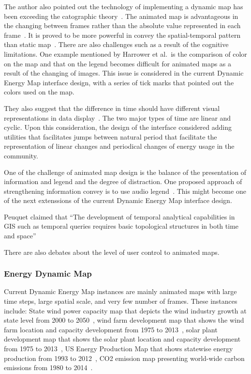 \documentclass[hidelinks,12pt]{article}
\begin{document}
The author also pointed out the technology of implementing a dynamic
map has been exceeding the catographic theory~\cite{Harrower2008}. The
animated map is advantageous in the changing between frames rather
than the absolute value represented in each
frame~\cite{Dorling1992}. It is proved to be more powerful in convey
the spatial-temporal pattern than static
map~\cite{McEachern1998}. There are also challenges such as a result
of the cognitive limitations. One example mentioned by Harrower et
al.\ is the comparison of color on the map and that on the legend
becomes difficult for animated maps as a result of the changing of
images. This issue is considered in the current Dynamic Energy Map
interface design, with a series of tick marks that pointed out the
colors used on the map.

They also suggest that the difference in time should have different
visual representations in data display~\cite{Harrower2008}. The two
major types of time are linear and cyclic. Upon this consideration,
the design of the interface considered adding utilities that
facilitates jumps between natural period that facilitate the
representation of linear changes and periodical changes of energy
usage in the community.

One of the challenge of animated map design is the balance of the
presentation of information and legend and the degree of
distraction. One proposed approach of strengthening information convey
is to use audio legend~\cite{Harrower2008}. This might become one of
the next extenssions of the current Dynamic Energy Map interface
design.

Peuquet claimed that ``The development of temporal analytical
capabilities in GIS such as temporal queries requires basic
topological structures in both time and space''

There are also debates about the level of user control to animated
maps. 
\subsubsection{Energy Dynamic Map}
Current Dynamic Energy Map instances are mainly animated maps with
large time steps, large spatial scale, and very few number of
frames. These instances include: State wind power capacity map that
depicts the wind industry growth at state level from 2000 to
2050~\cite{DOEWind}, wind farm development map that shows the wind
farm location and capacity development from 1975 to
2013~\cite{DOEWindFarm}, solar plant development map that shows the
solar plant location and capacity development from 1975 to
2013~\cite{DOESolarPlant}, US Energy Production Map that shows
statewise energy production from 1993 to 2012~\cite{DOEEnergyProduct},
CO2 emission map presenting world-wide carbon emissions from 1980 to
2014~\cite{CO2Atlas}.
\end{document}

